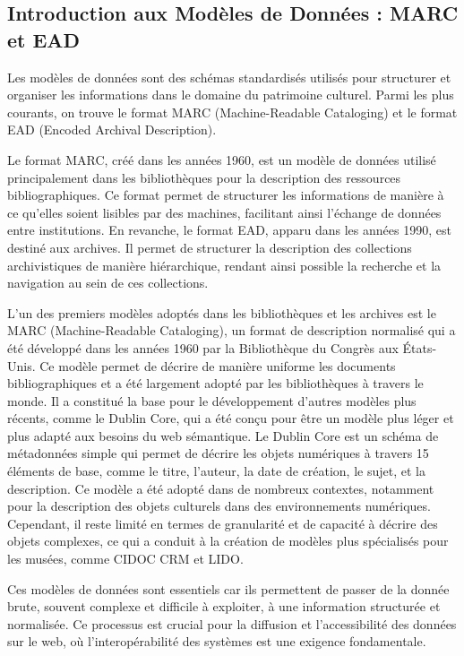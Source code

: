\subsection{Introduction aux Modèles de Données : MARC et EAD}

Les modèles de données sont des schémas standardisés utilisés pour structurer et organiser les informations dans le domaine du patrimoine culturel. Parmi les plus courants, on trouve le format MARC (Machine-Readable Cataloging) et le format EAD (Encoded Archival Description). \newline

Le format MARC, créé dans les années 1960, est un modèle de données utilisé principalement dans les bibliothèques pour la description des ressources bibliographiques. Ce format permet de structurer les informations de manière à ce qu'elles soient lisibles par des machines, facilitant ainsi l'échange de données entre institutions. En revanche, le format EAD, apparu dans les années 1990, est destiné aux archives. Il permet de structurer la description des collections archivistiques de manière hiérarchique, rendant ainsi possible la recherche et la navigation au sein de ces collections.\newline

L’un des premiers modèles adoptés dans les bibliothèques et les archives est le MARC (Machine-Readable Cataloging), un format de description normalisé qui a été développé dans les années 1960 par la Bibliothèque du Congrès aux États-Unis. Ce modèle permet de décrire de manière uniforme les documents bibliographiques et a été largement adopté par les bibliothèques à travers le monde. Il a constitué la base pour le développement d’autres modèles plus récents, comme le Dublin Core, qui a été conçu pour être un modèle plus léger et plus adapté aux besoins du web sémantique.
Le Dublin Core est un schéma de métadonnées simple qui permet de décrire les objets numériques à travers 15 éléments de base, comme le titre, l’auteur, la date de création, le sujet, et la description. Ce modèle a été adopté dans de nombreux contextes, notamment pour la description des objets culturels dans des environnements numériques. Cependant, il reste limité en termes de granularité et de capacité à décrire des objets complexes, ce qui a conduit à la création de modèles plus spécialisés pour les musées, comme CIDOC CRM et LIDO.\newline

Ces modèles de données sont essentiels car ils permettent de passer de la donnée brute, souvent complexe et difficile à exploiter, à une information structurée et normalisée. Ce processus est crucial pour la diffusion et l’accessibilité des données sur le web, où l'interopérabilité des systèmes est une exigence fondamentale. \newline

